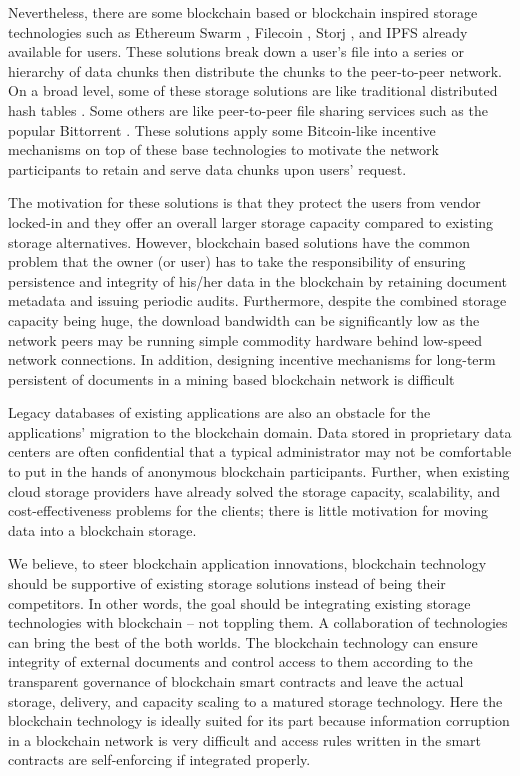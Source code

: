 Nevertheless, there are some blockchain based or blockchain inspired storage technologies such as Ethereum Swarm \cite{swarm}, Filecoin \cite{filecoin}, Storj \cite{Wilkinson14storja}, and IPFS \cite{ipfs} already available for users. These solutions break down a user's file into a series or hierarchy of data chunks then distribute the chunks to the peer-to-peer network. On a broad level, some of these storage solutions are like traditional distributed hash tables \cite{Maymounkov:2002:KPI:646334.687801} \cite{10.1007/978-3-540-45172-3_4}. Some others are like peer-to-peer file sharing services such as the popular Bittorrent \cite{Pouwelse:2005:BPF:2138958.2138984}. These solutions apply some Bitcoin-like incentive mechanisms on top of these base technologies to motivate the network participants to retain and serve data chunks upon users' request.  

The motivation for these solutions is that they protect the users from vendor locked-in and they offer an overall larger storage capacity compared to existing storage alternatives. However, blockchain based solutions have the common problem that the owner (or user) has to take the responsibility of ensuring persistence and integrity of his/her data in the blockchain by retaining document metadata and issuing periodic audits. Furthermore, despite the combined storage capacity being huge, the download bandwidth can be significantly low as the network peers may be running simple commodity hardware behind low-speed network connections. In addition, designing incentive mechanisms for long-term persistent of documents in a mining based blockchain network is difficult 

Legacy databases of existing applications are also an obstacle for the applications' migration to the blockchain domain. Data stored in proprietary data centers are often confidential that a typical administrator may not be comfortable to put in the hands of anonymous blockchain participants. Further, when existing cloud storage providers \cite{Murty:2008:PAW:1407893} \cite{googleCloud} have already solved the storage capacity, scalability, and cost-effectiveness problems for the clients; there is little motivation for moving data into a blockchain storage.     

We believe, to steer blockchain application innovations, blockchain technology should be supportive of existing storage solutions instead of being their competitors. In other words, the goal should be integrating existing storage technologies with blockchain -- not toppling them. A collaboration of technologies can bring the best of the both worlds. The blockchain technology can ensure integrity of external documents and control access to them according to the transparent governance of blockchain smart contracts and leave the actual storage, delivery, and capacity scaling to a matured storage technology. Here the blockchain technology is ideally suited for its part because information corruption in a blockchain network is very difficult and access rules written in the smart contracts are self-enforcing if integrated properly.


